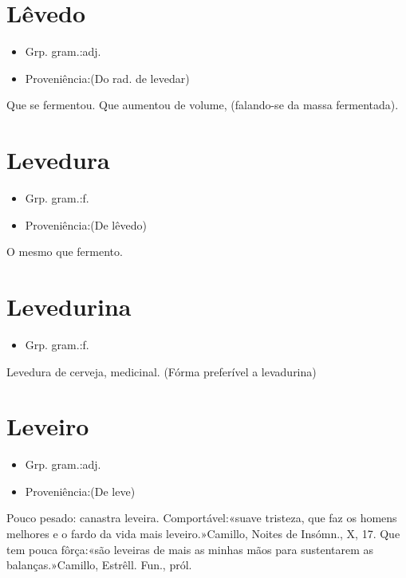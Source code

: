 \section{Lêvedo}
\begin{itemize}
\item {Grp. gram.:adj.}
\end{itemize}
\begin{itemize}
\item {Proveniência:(Do rad. de \textunderscore levedar\textunderscore )}
\end{itemize}
Que se fermentou.
Que aumentou de volume, (falando-se da massa fermentada).
\section{Levedura}
\begin{itemize}
\item {Grp. gram.:f.}
\end{itemize}
\begin{itemize}
\item {Proveniência:(De \textunderscore lêvedo\textunderscore )}
\end{itemize}
O mesmo que \textunderscore fermento\textunderscore .
\section{Levedurina}
\begin{itemize}
\item {Grp. gram.:f.}
\end{itemize}
Levedura de cerveja, medicinal.
(Fórma preferível a \textunderscore levadurina\textunderscore )
\section{Leveiro}
\begin{itemize}
\item {Grp. gram.:adj.}
\end{itemize}
\begin{itemize}
\item {Proveniência:(De \textunderscore leve\textunderscore )}
\end{itemize}
Pouco pesado: \textunderscore canastra leveira\textunderscore .
Comportável:«\textunderscore suave tristeza, que faz os homens melhores e o fardo da vida mais leveiro.\textunderscore »Camillo, \textunderscore Noites de Insómn.\textunderscore , X, 17.
Que tem pouca fôrça:«\textunderscore são leveiras de mais as minhas mãos para sustentarem as balanças.\textunderscore »Camillo, \textunderscore Estrêll. Fun.\textunderscore , pról.
